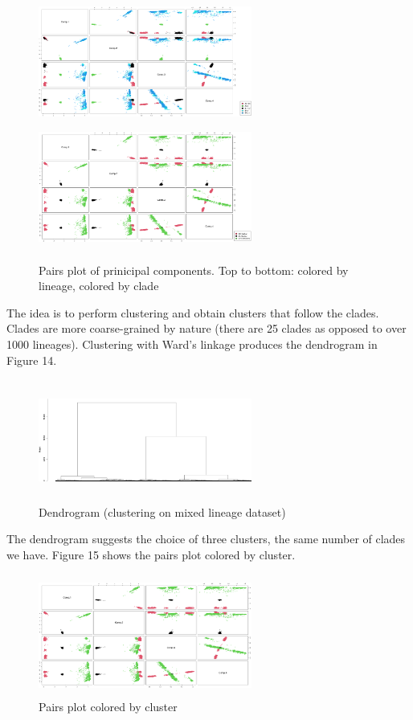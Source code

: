 \documentclass[twoside,twocolumn]{article}
\begin{document}
	\begin{figure}[h]
		\caption{Pairs plot of prinicipal components. Top to bottom: colored by lineage, colored by clade}
		\label{pairsx}
		\centering
		\includegraphics[width=70mm, height=40mm]{pairsx.png}
		\includegraphics[width=70mm, height=40mm]{pairsx2.png}
	\end{figure}
	The idea is to perform clustering and obtain clusters that follow the clades. Clades are more coarse-grained by nature (there are 25 clades as opposed to over 1000 lineages). Clustering with Ward's linkage produces the dendrogram in Figure 14.
	\begin{figure}[h]
		\caption{Dendrogram (clustering on mixed lineage dataset)}
		\label{ward2}
		\centering
		\includegraphics[width=70mm, height=40mm]{ward.png}
	\end{figure}
	The dendrogram suggests the choice of three clusters, the same number of clades we have. Figure 15 shows the pairs plot colored by cluster.
	\begin{figure}[h]
		\caption{Pairs plot colored by cluster}
		\label{pairs3}
		\centering
		\includegraphics[width=70mm, height=40mm]{pairs3.png}
	\end{figure}
\end{document}
